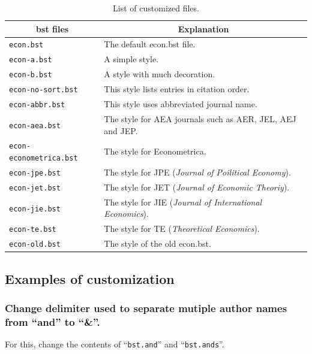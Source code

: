 \documentclass[10pt]{article}
\begin{document}
\begin{table}[htbp]
\begin{flushleft}
\caption{List of customized files.}
\label{tab:c-files} 
\begin{tabular}{l|l} \hline \hline
\multicolumn{1}{c}{bst files} & \multicolumn{1}{c}{Explanation} \\\hline
\texttt{econ.bst}              & The default econ.bst file. \\\hline
\texttt{econ-a.bst}            & A simple style. \\\hline
\texttt{econ-b.bst}            & A style with much decoration. \\\hline
\texttt{econ-no-sort.bst}      & This style lists entries in citation order. \\\hline
\texttt{econ-abbr.bst}         & This style uses abbreviated journal name. \\\hline
\texttt{econ-aea.bst}          & The style for AEA journals such as AER, JEL, AEJ and JEP. \\\hline
\texttt{econ-econometrica.bst} & The style for Econometrica. \\\hline
\texttt{econ-jpe.bst}          & The style for JPE (\textit{Journal of Poilitical Economy}). \\\hline
\texttt{econ-jet.bst}          & The style for JET (\textit{Journal of Economic Theoriy}). \\\hline
\texttt{econ-jie.bst}          & The style for JIE (\textit{Journal of International Economics}). \\\hline
\texttt{econ-te.bst}           & The style for TE (\textit{Theoretical Economics}). \\\hline
\texttt{econ-old.bst}          & The style of the old econ.bst. \\\hline
\end{tabular}
\end{flushleft}
\end{table}

\subsection{Examples of customization}

\subsubsection{Change delimiter used to separate mutiple author names
   from ``and'' to ``\&''.}

For this, change the contents of ``\texttt{bst.and}'' and ``\texttt{bst.ands}''.
\end{document}
